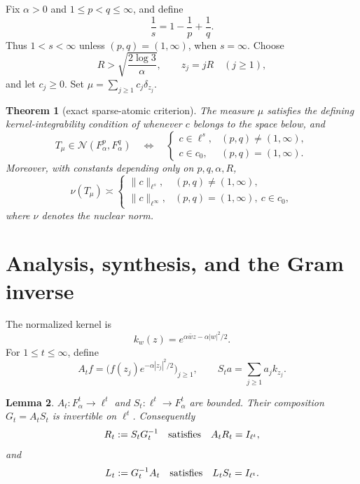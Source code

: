 \documentclass[10pt]{article}
\newtheorem{theorem}{Theorem}
\newtheorem{lemma}[theorem]{Lemma}
\newcommand{\Nuc}{\mathcal N}
\begin{document}
Fix $\alpha>0$ and $1\le p<q\le\infty$, and define
\begin{equation}\label{eq:s}
             \frac1s=1-\frac1p+\frac1q.
\end{equation}
Thus $1<s<\infty$ unless $(p,q)=(1,\infty)$, when $s=\infty$.
Choose
\begin{equation}\label{eq:R}
                 R>\sqrt{\frac{2\log 3}{\alpha}},
        \qquad z_j=jR\quad(j\ge1),
\end{equation}
and let $c_j\ge0$.  Set $\mu=\sum_{j\ge1}c_j\delta_{z_j}$.

\begin{theorem}[exact sparse-atomic criterion]\label{thm:main}
The measure $\mu$ satisfies the defining kernel-integrability condition of
\cite{MaLuZu} whenever $c$ belongs to the space below, and
\[
 T_\mu\in\Nuc(F_\alpha^p,F_\alpha^q)
 \quad\Longleftrightarrow\quad
 \begin{cases}
 c\in\ell^s,&(p,q)\ne(1,\infty),\\
 c\in c_0,&(p,q)=(1,\infty).
 \end{cases}
\]
Moreover, with constants depending only on $p,q,\alpha,R$,
\[
 \nu(T_\mu)\asymp
 \begin{cases}
 \|c\|_{\ell^s},&(p,q)\ne(1,\infty),\\
 \|c\|_{\ell^\infty},&(p,q)=(1,\infty),\ c\in c_0,
 \end{cases}
\]
where $\nu$ denotes the nuclear norm.
\end{theorem}

\section*{Analysis, synthesis, and the Gram inverse}

The normalized kernel is
\[
 k_w(z)=e^{\alpha\bar w z-\alpha|w|^2/2}.
\]
For $1\le t\le\infty$, define
\[
 A_t f=\bigl(f(z_j)e^{-\alpha|z_j|^2/2}\bigr)_{j\ge1},
 \qquad
 S_t a=\sum_{j\ge1}a_jk_{z_j}.
\]

\begin{lemma}\label{lem:maps}
$A_t:F_\alpha^t\to\ell^t$ and $S_t:\ell^t\to F_\alpha^t$ are bounded.  Their
composition $G_t=A_tS_t$ is invertible on $\ell^t$.  Consequently
\[
       R_t:=S_tG_t^{-1}\quad\hbox{satisfies}\quad A_tR_t=I_{\ell^t},
\]
and
\[
       L_t:=G_t^{-1}A_t\quad\hbox{satisfies}\quad L_tS_t=I_{\ell^t}.
\]
\end{lemma}
\end{document}
